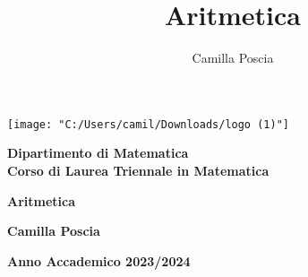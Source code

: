 \documentclass[italian,11pt,a4paper]{report}
\title{Aritmetica}
\author{Camilla Poscia}
\begin{document}
	
	\begin{titlepage}
		\centering
		\texttt{[image: "C:/Users/camil/Downloads/logo (1)"]} \\
		
		\vspace{20mm}
		
		\begin{Large}
			\textbf{Dipartimento di Matematica} \\
			\textbf{Corso di Laurea Triennale in Matematica} \\
		\end{Large}
		
		\vspace{30mm}
		
		\huge
		\textbf{Aritmetica} \\
		
		\vspace{65mm}
		
		\LARGE
		\textbf{Camilla Poscia} \\
		
		\vfill
		
		\hrulefill
		
		\vspace{5mm}
		
		\Large
		\textbf{Anno Accademico 2023/2024}
		
	\end{titlepage}
	
\end{document}

